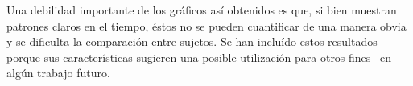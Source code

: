 Una debilidad importante de los gr\'aficos as\'i obtenidos es que, si bien muestran patrones 
claros en el tiempo, \'estos no se pueden cuantificar de una manera obvia y se dificulta la
comparaci\'on entre sujetos. Se han inclu\'ido estos resultados porque sus caracter\'isticas 
sugieren una posible utilizaci\'on para otros fines --en alg\'un trabajo futuro.



%
%


